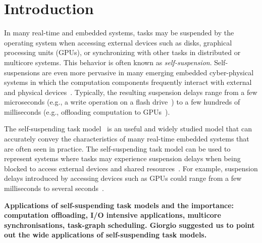 \section{Introduction}

In many real-time and embedded systems, tasks may be suspended by the operating system when accessing external devices such as disks, graphical processing units (GPUs), or synchronizing with other tasks in distributed or multicore systems. 
This behavior is often known as \emph{self-suspension}. Self-suspensions are even more pervasive in many emerging embedded cyber-physical systems in which the computation components frequently interact with external and physical devices~\cite{Kang:rtss07,Kato_2011}. Typically, the resulting suspension delays range from a few microseconds (e.g., a write operation on a flash drive~\cite{Kang:rtss07}) to a few hundreds of milliseconds (e.g., offloading computation to GPUs~\cite{Kato_2011,Liu_2014}).

The self-suspending task model~\cite{LA:rtss09} is an useful and widely studied model that can accurately convey the characteristics of many real-time embedded systems that are often seen in practice. The self-suspending task model can be used to represent systems where tasks may experience suspension delays when being blocked to access external devices and shared resources~\cite{Chen:DAC2014,LA:rtas10,LA:rtcsa10,LA:rtss12}. For example, suspension delays introduced by accessing devices such as GPUs could range from a few milliseconds to several seconds~\cite{Kato:rtss11}. 

\textbf{Applications of self-suspending task models and the importance: computation offloading, I/O intensive applications, multicore synchronisations, task-graph scheduling. Giorgio suggested us to point out the wide applications of self-suspending task models.}
  
  